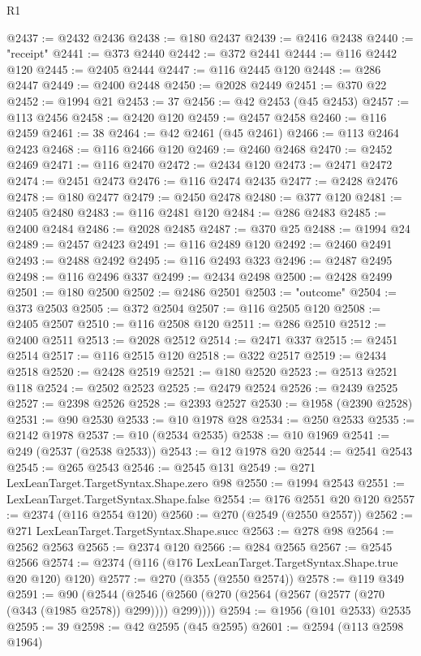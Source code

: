\begin{lexlean}{R1}
\begin{coremodule}
@2437 := @2432 @2436
@2438 := @180 @2437
@2439 := @2416 @2438
@2440 := "receipt"
@2441 := @373 @2440
@2442 := @372 @2441
@2444 := @116 @2442 @120
@2445 := @2405 @2444
@2447 := @116 @2445 @120
@2448 := @286 @2447
@2449 := @2400 @2448
@2450 := @2028 @2449
@2451 := @370 @22
@2452 := @1994 @21
@2453 := 37
@2456 := @42 @2453 (@45 @2453)
@2457 := @113 @2456
@2458 := @2420 @120
@2459 := @2457 @2458
@2460 := @116 @2459
@2461 := 38
@2464 := @42 @2461 (@45 @2461)
@2466 := @113 @2464 @2423
@2468 := @116 @2466 @120
@2469 := @2460 @2468
@2470 := @2452 @2469
@2471 := @116 @2470
@2472 := @2434 @120
@2473 := @2471 @2472
@2474 := @2451 @2473
@2476 := @116 @2474 @2435
@2477 := @2428 @2476
@2478 := @180 @2477
@2479 := @2450 @2478
@2480 := @377 @120
@2481 := @2405 @2480
@2483 := @116 @2481 @120
@2484 := @286 @2483
@2485 := @2400 @2484
@2486 := @2028 @2485
@2487 := @370 @25
@2488 := @1994 @24
@2489 := @2457 @2423
@2491 := @116 @2489 @120
@2492 := @2460 @2491
@2493 := @2488 @2492
@2495 := @116 @2493 @323
@2496 := @2487 @2495
@2498 := @116 @2496 @337
@2499 := @2434 @2498
@2500 := @2428 @2499
@2501 := @180 @2500
@2502 := @2486 @2501
@2503 := "outcome"
@2504 := @373 @2503
@2505 := @372 @2504
@2507 := @116 @2505 @120
@2508 := @2405 @2507
@2510 := @116 @2508 @120
@2511 := @286 @2510
@2512 := @2400 @2511
@2513 := @2028 @2512
@2514 := @2471 @337
@2515 := @2451 @2514
@2517 := @116 @2515 @120
@2518 := @322 @2517
@2519 := @2434 @2518
@2520 := @2428 @2519
@2521 := @180 @2520
@2523 := @2513 @2521 @118
@2524 := @2502 @2523
@2525 := @2479 @2524
@2526 := @2439 @2525
@2527 := @2398 @2526
@2528 := @2393 @2527
@2530 := @1958 (@2390 @2528)
@2531 := @90 @2530
@2533 := @10 @1978 @28
@2534 := @250 @2533
@2535 := @2142 @1978
@2537 := @10 (@2534 @2535)
@2538 := @10 @1969
@2541 := @249 (@2537 (@2538 @2533))
@2543 := @12 @1978 @20
@2544 := @2541 @2543
@2545 := @265 @2543
@2546 := @2545 @131
@2549 := @271 LexLeanTarget.TargetSyntax.Shape.zero @98
@2550 := @1994 @2543
@2551 := LexLeanTarget.TargetSyntax.Shape.false
@2554 := @176 @2551 @20 @120
@2557 := @2374 (@116 @2554 @120)
@2560 := @270 (@2549 (@2550 @2557))
@2562 := @271 LexLeanTarget.TargetSyntax.Shape.succ
@2563 := @278 @98
@2564 := @2562 @2563
@2565 := @2374 @120
@2566 := @284 @2565
@2567 := @2545 @2566
@2574 := @2374 (@116 (@176 LexLeanTarget.TargetSyntax.Shape.true @20 @120) @120)
@2577 := @270 (@355 (@2550 @2574))
@2578 := @119 @349
@2591 := @90
    (@2544 (@2546 (@2560 (@270 (@2564 (@2567 (@2577 (@270 (@343 (@1985 @2578)) @299)))) @299))))
@2594 := @1956 (@101 @2533) @2535
@2595 := 39
@2598 := @42 @2595 (@45 @2595)
@2601 := @2594 (@113 @2598 @1964)

\end{coremodule}
\end{lexlean}
